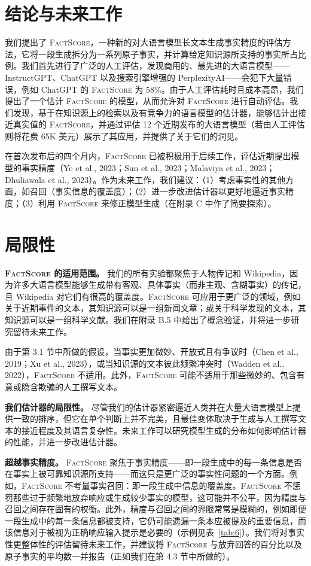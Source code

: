 \documentclass[11pt,UTF8,fontset=fandol]{ctexart}
\newcommand{\FS}{\textsc{FactScore}}
\begin{document}
\section{结论与未来工作}

我们提出了 \FS，一种新的对大语言模型长文本生成事实精度的评估方法，它将一段生成拆分为一系列原子事实，并计算给定知识源所支持的事实所占比例。我们首先进行了广泛的人工评估，发现商用的、最先进的大语言模型——InstructGPT、ChatGPT 以及搜索引擎增强的 PerplexityAI——会犯下大量错误，例如 ChatGPT 的 \FS{} 为 58\%。由于人工评估耗时且成本高昂，我们提出了一个估计 \FS{} 的模型，从而允许对 \FS{} 进行自动评估。我们发现，基于在知识源上的检索以及有竞争力的语言模型的估计器，能够估计出接近真实值的 \FS，并通过评估 12 个近期发布的大语言模型（若由人工评估则将花费 65K 美元）展示了其应用，并提供了关于它们的洞见。

在首次发布后的四个月内，\FS{} 已被积极用于后续工作，评估近期提出模型的事实精度（Ye et al., 2023；Sun et al., 2023；Malaviya et al., 2023；Dhuliawala et al., 2023）。作为未来工作，我们建议：（1）考虑事实性的其他方面，如召回（事实信息的覆盖度）；（2）进一步改进估计器以更好地逼近事实精度；（3）利用 \FS{} 来修正模型生成（在附录 C 中作了简要探索）。

\section*{局限性}

\textbf{\FS{} 的适用范围。} 我们的所有实验都聚焦于人物传记和 Wikipedia，因为许多大语言模型能够生成带有客观、具体事实（而非主观、含糊事实）的传记，且 Wikipedia 对它们有很高的覆盖度。\FS{} 可应用于更广泛的领域，例如关于近期事件的文本，其知识源可以是一组新闻文章；或关于科学发现的文本，其知识源可以是一组科学文献。我们在附录 B.5 中给出了概念验证，并将进一步研究留待未来工作。

由于第 3.1 节中所做的假设，当事实更加微妙、开放式且有争议时（Chen et al., 2019；Xu et al., 2023），或当知识源的文本彼此频繁冲突时（Wadden et al., 2022），\FS{} 不适用。此外，\FS{} 可能不适用于那些微妙的、包含有意或隐含欺骗的人工撰写文本。

\textbf{我们估计器的局限性。} 尽管我们的估计器紧密逼近人类并在大量大语言模型上提供一致的排序，但它在单个判断上并不完美，且最佳变体取决于生成与人工撰写文本的接近程度及其语言复杂性。未来工作可以研究模型生成的分布如何影响估计器的性能，并进一步改进估计器。

\textbf{超越事实精度。} \FS{} 聚焦于事实精度——即一段生成中的每一条信息是否在事实上被可靠知识源所支持——而这只是更广泛的事实性问题的一个方面。例如，\FS{} 不考量事实召回：即一段生成中信息的覆盖度。\FS{} 不惩罚那些过于频繁地放弃响应或生成较少事实的模型，这可能并不公平，因为精度与召回之间存在固有的权衡。此外，精度与召回之间的界限常常是模糊的，例如即便一段生成中的每一条信息都被支持，它仍可能遗漏一条本应被提及的重要信息，而该信息对于被视为正确响应输入提示是必要的（示例见表~\ref{tab:6}）。我们将对事实性更整体性的评估留待未来工作，并建议将 \FS{} 与放弃回答的百分比以及原子事实的平均数一并报告（正如我们在第 4.3 节中所做的）。
\end{document}
